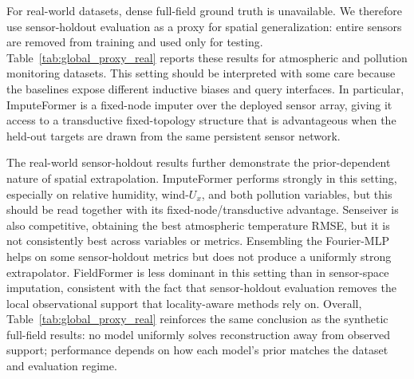 For real-world datasets, dense full-field ground truth is unavailable. We therefore use sensor-holdout evaluation as a proxy for spatial generalization: entire sensors are removed from training and used only for testing. Table~\ref{tab:global_proxy_real} reports these results for atmospheric and pollution monitoring datasets. This setting should be interpreted with some care because the baselines expose different inductive biases and query interfaces. In particular, ImputeFormer is a fixed-node imputer over the deployed sensor array, giving it access to a transductive fixed-topology structure that is advantageous when the held-out targets are drawn from the same persistent sensor network.

The real-world sensor-holdout results further demonstrate the prior-dependent nature of spatial extrapolation. ImputeFormer performs strongly in this setting, especially on relative humidity, wind-$U_x$, and both pollution variables, but this should be read together with its fixed-node/transductive advantage. Senseiver is also competitive, obtaining the best atmospheric temperature RMSE, but it is not consistently best across variables or metrics. Ensembling the Fourier-MLP helps on some sensor-holdout metrics but does not produce a uniformly strong extrapolator. FieldFormer is less dominant in this setting than in sensor-space imputation, consistent with the fact that sensor-holdout evaluation removes the local observational support that locality-aware methods rely on. Overall, Table~\ref{tab:global_proxy_real} reinforces the same conclusion as the synthetic full-field results: no model uniformly solves reconstruction away from observed support; performance depends on how each model's prior matches the dataset and evaluation regime.

